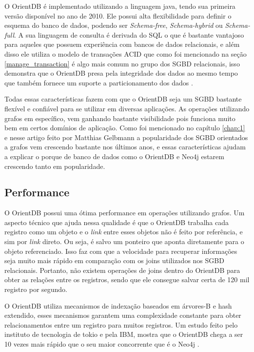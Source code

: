 	O OrientDB é implementado utilizando a linguagem java, tendo sua primeira versão disponível no ano de 2010. Ele possui alta flexibilidade para definir o esquema do banco de dados, podendo ser \textit{Schema-free}, \textit{Schema-hybrid} ou \textit{Schema-full}. A sua linguagem de consulta é derivada do SQL o que é bastante vantajoso para aqueles que possuem experiência com bancos de dados relacionais, e além disso ele utiliza o modelo de transações ACID que como foi mencionado na seção \ref{manage_transaction} é algo mais comum no grupo dos SGBD relacionais, isso demonstra que o OrientDB presa pela integridade dos dados ao mesmo tempo que também fornece um suporte a particionamento dos dados \cite{OrientDB} \cite{vschart}.
	
	Todas essas características fazem com que o OrientDB seja um SGBD bastante flexível e confiável para se utilizar em diversas aplicações. As operações utilizando grafos em específico, vem ganhando bastante visibilidade pois funciona muito bem em certos domínios de aplicação. Como foi mencionado no capítulo \ref{chap:1} e nesse artigo feito por Matthias Gelbmann \cite{Graphpopularity} a popularidade dos SGBD orientados a grafos vem crescendo bastante nos últimos anos, e essas características ajudam a explicar o porque de banco de dados como o OrientDB e Neo4j estarem crescendo tanto em popularidade.
	
\subsection{Performance} \label{orient_performance}
	O OrientDB possui uma ótima performance em operações utilizando grafos. Um aspecto técnico que ajuda nessa qualidade é que o OrientDB trabalha cada registro como um objeto e o \textit{link} entre esses objetos não é feito por referência, e sim por \textit{link} direto. Ou seja, é salvo um ponteiro que aponta diretamente para o objeto referenciado. Isso faz com que a velocidade para recuperar informações seja muito mais rápido em comparação com os joins utilizados nos SGBD relacionais. Portanto, não existem operações de joins dentro do OrientDB para obter as relações entre os registros, sendo que ele consegue salvar certa de 120 mil registro por segundo.
	
	O OrientDB utiliza mecanismos de indexação baseados em árvores-B e hash extendido, esses mecanismos garantem uma complexidade constante para obter relacionamentos entre um registro para muitos registros. Um estudo feito pelo instituto de tecnologia de tokio e pela IBM, mostra que o OrientDB chega a ser 10 vezes mais rápido que o seu maior concorrente que é o Neo4j \cite{dayarathna2012xgdbench}.
	

